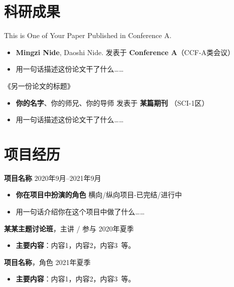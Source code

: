 \documentclass[11pt]{article}
\newlength{\iconwidth}
\begin{document}
    \begin{minipage}[t]{\textwidth}
    \section[科研成果]{\makebox[\iconwidth][c]{\color{primary_color}{\faAtom}}\quad 科研成果}

    This is One of Your Paper Published in Conference A.
    \begin{itemize}
        \item \textbf{Mingzi Nide}, Daoshi Nide. \hfill 发表于 \textbf{Conference A}（CCF-A类会议）
        \item 用一句话描述这份论文干了什么\dots\dots
    \end{itemize}

    \vspace{0.5em}
    《另一份论文的标题》
    \begin{itemize}
        \item  \textbf{你的名字}、你的师兄、你的导师 \hfill 发表于 \textbf{某篇期刊} （SCI-1区）
        \item 用一句话描述这份论文干了什么\dots\dots
    \end{itemize}
    
    \vspace{1.2em}
    \end{minipage}

    \begin{minipage}[t]{\textwidth}
    \section[项目经历]{\makebox[\iconwidth][c]{\color{primary_color}{\faChalkboardTeacher}}\quad 项目经历}
    
    {\large \textbf{项目名称}} \hfill 2020年9月--2021年9月
    \begin{itemize}
        \item \textbf{你在项目中扮演的角色} \hfill 横向/纵向项目-已完结/进行中
        \item 用一句话介绍你在这个项目中做了什么\dots\dots
    \end{itemize}

    \vspace{0.5em}
    {\large \textbf{某某主题讨论班}}，主讲 / 参与 \hfill 2020年夏季
    \begin{itemize}
        \item \textbf{主要内容}：内容1，内容2，内容3\ 等。
    \end{itemize}

    \vspace{0.5em}
    {\large \textbf{项目名称}}，角色 \hfill 2021年夏季
    \begin{itemize}
        \item \textbf{主要内容}：内容1，内容2，内容3\ 等。
    \end{itemize}
    
    \vspace{1.2em}
    \end{minipage}
    
\end{document}
